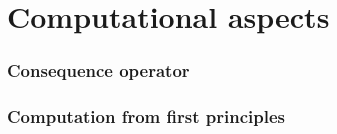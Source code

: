 \part{Computational aspects}
\section{Consequence operator}

\section{Computation from first principles}

% 
%
